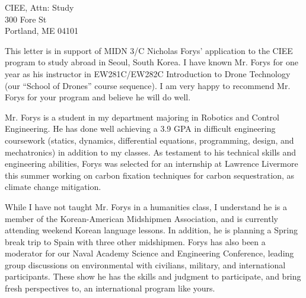 \documentclass[12pt]{wrceletter}
\date{\today}
\begin{document}
\begin{letter}{%
CIEE, Attn: Study\\
300 Fore St\\
Portland, ME 04101}

\opening{}
\raggedright %
\setlength{\parindent}{15pt} %

This letter is in support of MIDN 3/C Nicholas Forys' application to the CIEE program to study abroad in Seoul, South Korea.  I have known Mr. Forys for one year as his instructor in EW281C/EW282C Introduction to Drone Technology (our ``School of Drones'' course sequence). I am very happy to recommend Mr. Forys for your program and believe he will do well. 

Mr. Forys is a student in my department majoring in Robotics and Control Engineering.  He has done well achieving a 3.9 GPA in difficult engineering coursework (statics, dynamics, differential equations, programming, design, and mechatronics) in addition to my classes. As testament to his technical skills and engineering abilities, Forys was selected for an internship at Lawrence Livermore this summer working on carbon fixation techniques for carbon sequestration, as climate change mitigation.

While I have not taught Mr. Forys in a humanities class, I understand he is a member of the Korean-American Midshipmen Association, and is currently attending weekend Korean language lessons. In addition, he is planning a Spring break trip to Spain with three other midshipmen. Forys has also been a moderator for our Naval Academy Science and Engineering Conference, leading group discussions on environmental with civilians, military, and international participants. These show he has the skills and judgment to participate, and bring fresh perspectives to, an international program like yours. 


\closing{~} %

\end{letter}
\end{document}
